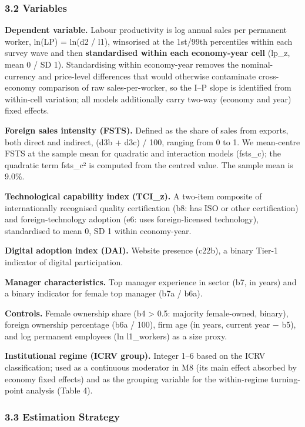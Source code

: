 \documentclass[
  12pt,a4paper]{article}
\begin{document}
\hypertarget{variables}{%
\subsubsection{3.2 Variables}\label{variables}}

\textbf{Dependent variable.} Labour productivity is log annual sales per
permanent worker, ln(LP) = ln(d2 / l1), winsorised at the 1st/99th
percentiles within each survey wave and then \textbf{standardised within
each economy-year cell} (lp\_z, mean 0 / SD 1). Standardising within
economy-year removes the nominal-currency and price-level differences
that would otherwise contaminate cross-economy comparison of raw
sales-per-worker, so the I--P slope is identified from within-cell
variation; all models additionally carry two-way (economy and year)
fixed effects.

\textbf{Foreign sales intensity (FSTS).} Defined as the share of sales
from exports, both direct and indirect, (d3b + d3c) / 100, ranging from
0 to 1. We mean-centre FSTS at the sample mean for quadratic and
interaction models (fsts\_c); the quadratic term fsts\_c² is computed
from the centred value. The sample mean is 9.0\%.

\textbf{Technological capability index (TCI\_z).} A two-item composite
of internationally recognised quality certification (b8: has ISO or
other certification) and foreign-technology adoption (e6: uses
foreign-licensed technology), standardised to mean 0, SD 1 within
economy-year.

\textbf{Digital adoption index (DAI).} Website presence (c22b), a binary
Tier-1 indicator of digital participation.

\textbf{Manager characteristics.} Top manager experience in sector (b7,
in years) and a binary indicator for female top manager (b7a / b6a).

\textbf{Controls.} Female ownership share (b4 \textgreater{} 0.5:
majority female-owned, binary), foreign ownership percentage (b6a /
100), firm age (in years, current year − b5), and log permanent
employees (ln l1\_workers) as a size proxy.

\textbf{Institutional regime (ICRV group).} Integer 1--6 based on the
ICRV classification; used as a continuous moderator in M8 (its main
effect absorbed by economy fixed effects) and as the grouping variable
for the within-regime turning-point analysis (Table 4).

\hypertarget{estimation-strategy}{%
\subsubsection{3.3 Estimation Strategy}\label{estimation-strategy}}
\end{document}
